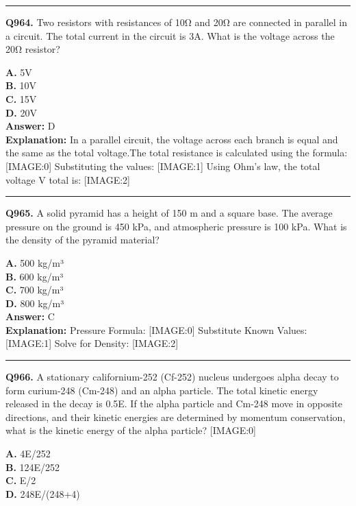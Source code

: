 \documentclass[12pt]{article}
\begin{document}
\hrule
\vspace{1em}


\noindent
\textbf{Q964.} Two resistors with resistances of 10Ω and 20Ω are connected in parallel in a circuit. The total current in the circuit is 3A. What is the voltage across the 20Ω resistor?



\textbf{A.} 5V \\
\textbf{B.} 10V \\
\textbf{C.} 15V \\
\textbf{D.} 20V \\

\textbf{Answer:} D \\
\textbf{Explanation:} In a parallel circuit, the voltage across each branch is equal and the same as the total voltage.The total resistance is calculated using the formula:
[IMAGE:0]
Substituting the values:
[IMAGE:1]
Using Ohm's law, the total voltage
V
total​ is:
[IMAGE:2]

\hrule
\vspace{1em}


\noindent
\textbf{Q965.} A solid pyramid has a height of 150 m and a square base. The average pressure on the ground is 450 kPa, and atmospheric pressure is 100 kPa. What is the density of the pyramid material?



\textbf{A.} 500 kg/m³ \\
\textbf{B.} 600 kg/m³ \\
\textbf{C.} 700 kg/m³ \\
\textbf{D.} 800 kg/m³ \\

\textbf{Answer:} C \\
\textbf{Explanation:} Pressure Formula:
[IMAGE:0]
Substitute Known Values:
[IMAGE:1]
Solve for Density:
[IMAGE:2]

\hrule
\vspace{1em}


\noindent
\textbf{Q966.} A stationary californium-252 (Cf-252) nucleus undergoes alpha decay to form curium-248 (Cm-248) and an alpha particle. The total kinetic energy released in the decay is 0.5E. If the alpha particle and Cm-248 move in opposite directions, and their kinetic energies are determined by momentum conservation, what is the kinetic energy of the alpha particle?
[IMAGE:0]



\textbf{A.} 4E/252 \\
\textbf{B.} 124E/252 \\
\textbf{C.} E/2 \\
\textbf{D.} 248E/(248+4) \\
\end{document}
